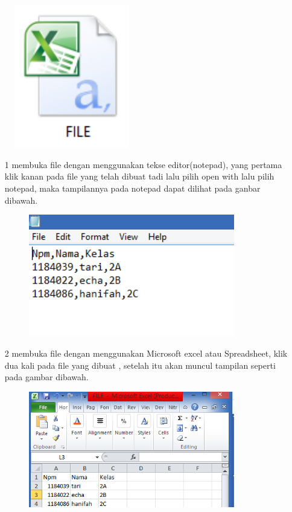\begin{enumerate}
       \begin{figure}[!htbp]
    \begin{center}
    \includegraphics[width=5cm]{gambar/8.png}
    \end{center}   
    \end{figure}
     \begin{enumerate}
         \item [1]membuka file dengan menggunakan tekse editor(notepad), yang pertama klik kanan pada file yang telah dibuat tadi lalu pilih open with lalu pilih notepad, maka tampilannya pada notepad dapat dilihat pada ganbar dibawah.
     \begin{figure}[!htbp]
    \begin{center}
    \includegraphics[width=9cm]{gambar/9.png}
    \end{center}   
    \end{figure}
    \newpage
     \item [2]membuka file dengan menggunakan Microsoft excel atau Spreadsheet, klik dua kali pada file yang dibuat , setelah itu akan  muncul tampilan seperti pada gambar dibawah.
     \begin{figure}[!htbp]
    \begin{center}
    \includegraphics[width=9cm]{gambar/1.png}
    \end{center}   
    \end{figure}
     \end{enumerate}
\end{enumerate}

